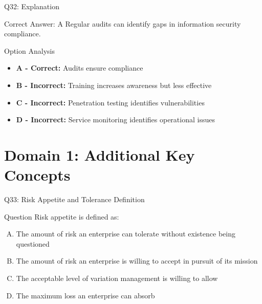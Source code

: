 \documentclass{beamer}
\begin{document}
	\begin{frame}{Q32: Explanation}
		\begin{block}{Correct Answer: A}
			Regular audits can identify gaps in information security compliance.
		\end{block}
		\begin{block}{Option Analysis}
			\begin{itemize}
				\item \textbf{A - Correct:} Audits ensure compliance
				\item \textbf{B - Incorrect:} Training increases awareness but less effective
				\item \textbf{C - Incorrect:} Penetration testing identifies vulnerabilities
				\item \textbf{D - Incorrect:} Service monitoring identifies operational issues
			\end{itemize}
		\end{block}
	\end{frame}
	
	
	\section{Domain 1: Additional Key Concepts}
	
	\begin{frame}{Q33: Risk Appetite and Tolerance Definition}
		\begin{block}{Question}
			Risk appetite is defined as:
		\end{block}
		\begin{enumerate}[(A)]
			\item The amount of risk an enterprise can tolerate without existence being questioned
			\item The amount of risk an enterprise is willing to accept in pursuit of its mission
			\item The acceptable level of variation management is willing to allow
			\item The maximum loss an enterprise can absorb
		\end{enumerate}
	\end{frame}
	
\end{document}
